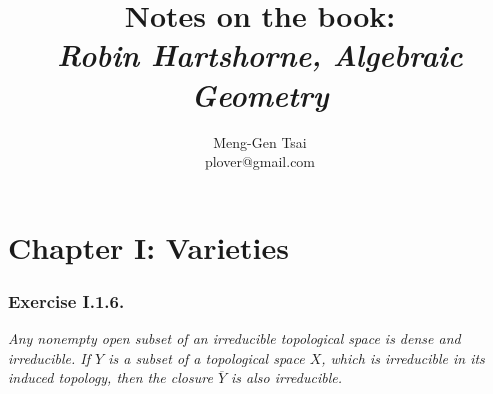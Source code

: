 \documentclass{article}
\title{\textbf{Notes on the book: \\ \emph{Robin Hartshorne, Algebraic Geometry}}}
\author{Meng-Gen Tsai \\ plover@gmail.com}
\begin{document}
\maketitle
\tableofcontents












\newpage
\section*{Chapter I: Varieties \\}



\subsubsection*{Exercise I.1.6.}
\emph{Any nonempty open subset of an irreducible topological space is dense and irreducible.
If $Y$ is a subset of a topological space $X$, which is irreducible in its induced topology,
then the closure $\overline{Y}$ is also irreducible.} \\
\end{document}
